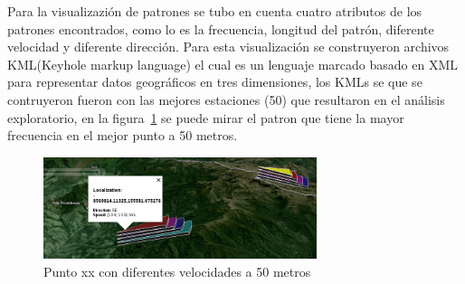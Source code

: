 Para la visualizazión de patrones se tubo en cuenta cuatro atributos de los patrones encontrados, como lo es
la frecuencia, longitud del patrón, diferente velocidad y diferente dirección. Para esta visualización se
construyeron archivos KML(Keyhole markup language) el cual es un lenguaje marcado basado en XML para representar
datos geográficos en tres dimensiones, los KMLs se que se contruyeron fueron con las mejores estaciones (50) que resultaron
en el análisis exploratorio, en la figura~\ref{fig:speedpattern} se puede mirar el patron que tiene la mayor frecuencia en el
mejor punto a 50 metros.

\begin{figure}
  \centering
  \includegraphics[width = 8cm]{speedpattern.png}
  \caption{Punto xx con diferentes velocidades a 50 metros}
  \label{fig:speedpattern}
\end{figure}





